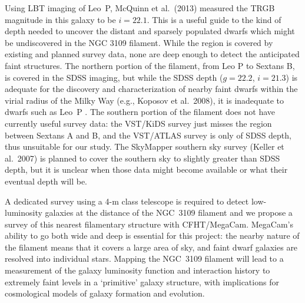 \documentclass[12pt]{article}
\begin{document}
Using LBT imaging of Leo~P, McQuinn et al.\ (2013) measured the TRGB magnitude in this galaxy to be $i=22.1$. 
This is a useful guide to the kind of depth needed to uncover the distant and sparsely populated dwarfs which
might be undiscovered in the NGC 3109 filament. While the region is covered by existing  and planned
survey data, none are deep enough to detect the anticipated faint structures.
The northern portion of  the filament, from Leo P to  Sextans B, is covered in the SDSS imaging, but 
while the SDSS  depth ($g=22.2$, $i=21.3$) is adequate for the discovery and characterization of nearby faint dwarfs
within the virial radius of the Milky Way (e.g., Koposov et al.\ 2008), it is inadequate to  dwarfs such as Leo~P . 
The southern portion of the filament does not have currently useful survey data:
the VST/KiDS survey just misses  the region between Sextans A and B, and the VST/ATLAS survey is
only of SDSS depth,  thus unsuitable for our study. The SkyMapper southern sky survey (Keller et al.\ 2007) is planned 
to cover the southern sky to slightly greater than SDSS depth, but it is unclear when those data might become available
or what their eventual depth will be.

A dedicated survey using a 4-m class telescope is required to detect low-luminosity galaxies at the distance of the NGC~3109 filament and 
we propose a survey  of this nearest filamentary structure with CFHT/MegaCam. MegaCam's ability to go both wide and deep is essential for this project: the nearby nature of the filament means that it covers a large area of sky, and faint dwarf galaxies are resolved into individual stars.
Mapping the NGC~3109 filament will lead to a measurement of the galaxy luminosity function and interaction history to extremely faint
levels in a `primitive' galaxy structure, with implications for cosmological models of galaxy formation and evolution.



\end{document}
